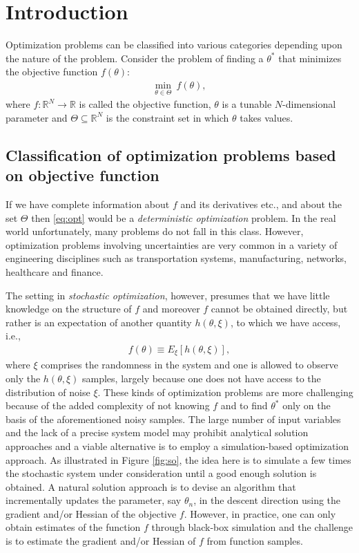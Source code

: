 \chapter{Introduction}
Optimization problems can be classified into various categories depending upon the nature of the problem. Consider the  problem of finding a $\theta^{*}$ that minimizes the objective function $f(\theta)$:
\begin{align}\label{eq:opt}
 \underset{\theta \in \Theta}{\min} ~f(\theta),
\end{align}
where $f \colon \mathbb{R}^N \to \mathbb{R}$ is called the objective function, $\theta$ is a tunable $N$-dimensional parameter and $\Theta \subseteq \mathbb{R}^N$ is the constraint set in which $\theta$ takes values. 
\section{Classification of optimization problems based on objective function}\label{sc:objclass}
If we have complete information about $f$ and its derivatives etc., and about the set $\Theta$ then \eqref{eq:opt} would be a \emph{deterministic optimization} problem. In the real world unfortunately, many problems do not fall in this class. However, optimization problems involving uncertainties are very common in a variety of engineering disciplines such as transportation systems, manufacturing, networks, healthcare and finance.

The setting in \emph{stochastic optimization}, however, presumes that we have little knowledge on the structure of $f$ and moreover $f$ cannot be obtained directly, but rather is an expectation of another quantity $h(\theta,\xi)$, to which we have access, i.e.,
\begin{align}\label{eq:stopt}
 f(\theta) \equiv E_{\xi}[h(\theta,\xi)], 
\end{align}
 where $\xi$ comprises the randomness in the system and one is allowed to observe only the $h(\theta,\xi)$ samples, largely  because one does not have access to the distribution of noise $\xi$. These kinds of optimization problems are more challenging because of the added complexity of not knowing $f$ and to find $\theta^{*}$ only on the basis of the aforementioned noisy samples. The large number of input variables and the lack of a precise system model may prohibit analytical solution approaches and a viable alternative is to employ a simulation-based optimization approach. As illustrated in Figure \ref{fig:so}, the idea here is to simulate a few times the stochastic system under consideration until a good enough solution is obtained. A natural solution approach is to devise an algorithm that incrementally updates the parameter, say $\theta_n$, in the descent direction using the gradient and/or Hessian of the objective $f$. However, in practice, one can only obtain estimates of the function $f$ through black-box simulation and the challenge is to estimate the gradient and/or Hessian of $f$ from function samples. \par

